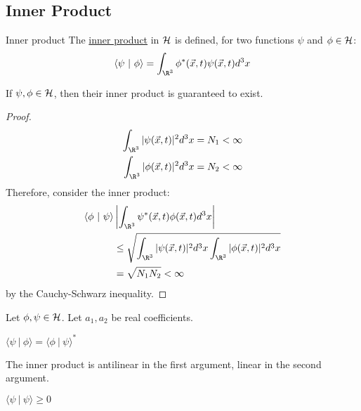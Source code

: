 \documentclass[../Main.tex]{subfiles}
\begin{document}
\subsection{Inner Product}
\begin{definition}{Inner product}
    The \underline{inner product} in $\mathcal{H}$ is defined, for two functions $\psi$ and $\phi \in \mathcal{H}$:
    \begin{equation}
        \langle \psi~|~\phi\rangle = \int_{\R^3} \phi^*(\vec{x}, t) \psi(\vec{x}, t) d^3x
        \label{eqnHilbInnProd}
    \end{equation}
\end{definition}
\begin{theorem}
    If $\psi, \phi \in \mathcal{H}$, then their inner product is guaranteed to exist.
    \label{thmInnProdExists}
\end{theorem}
\begin{proof}
    \begin{align*}
        \int_{\R^3} |\psi(\vec{x}, t)|^2 d^3x &= N_1 < \infty \\
        \int_{\R^3} |\phi(\vec{x}, t)|^2 d^3x &= N_2 < \infty 
    \end{align*}
    Therefore, consider the inner product:
    \begin{align*}
        \langle \phi~|~\psi\rangle& \left|\int_{\R^3} \psi^*(\vec{x}, t)\phi(\vec{x}, t) d^3 x\right| \\
        &\leq \sqrt{\int_{\R^3} |\psi(\vec{x}, t)|^2 d^3x \int_{\R^3} |\phi(\vec{x}, t)|^2 d^3x} \\
        &= \sqrt{N_1 N_2} < \infty
    \end{align*}
    by the Cauchy-Schwarz inequality.
\end{proof}
\begin{propositions}{
        Let $\phi, \psi \in \mathcal{H}$. Let $a_1, a_2$ be real coefficients.
        \label{propsInnProdProps}
    }
    \item $\langle \psi~|~\phi\rangle = \langle \phi~|~\psi\rangle^*$
    \item The inner product is antilinear in the first argument, linear in the second argument.
    \item $\langle \psi~|~\psi\rangle \geq 0$
\end{propositions}
\end{document}
